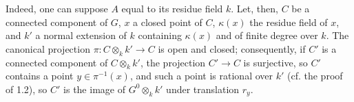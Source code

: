 Indeed, one can suppose $A$ equal to its residue field $k$. Let, then, $C$ be a connected component of $G$, $x$ a closed point of $C$, $\kappa(x)$ the residue field of $x$, and $k'$ a normal extension of $k$ containing $\kappa(x)$ and of finite degree over $k$. The canonical projection $\pi:C\otimes_kk'\to C$ is open and closed; consequently, if $C'$ is a connected component of $C\otimes_kk'$, the projection $C'\to C$ is surjective, so $C'$ contains a point $y\in\pi^{-1}(x)$, and such a point is rational over $k'$ (cf. the proof of 1.2), so $C'$ is the image of $G^0\otimes_kk'$ under translation $r_y$.
